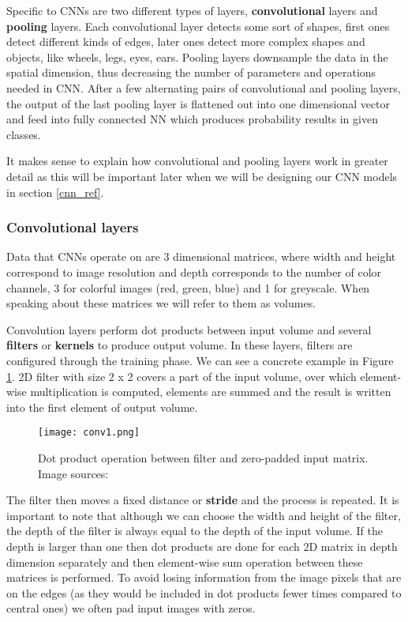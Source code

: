 Specific to CNNs are two different types of layers, \textbf{convolutional} layers and \textbf{pooling} layers.
Each convolutional layer detects some sort of shapes, first ones detect different kinds of edges, later ones detect more complex shapes and objects, like wheels, legs, eyes, ears.
Pooling layers downsample the data in the spatial dimension, thus decreasing the number of parameters and operations needed in CNN.
After a few alternating pairs of convolutional and pooling layers, the output of the last pooling layer is flattened out into one dimensional vector and feed into fully connected NN which produces probability results in given classes.

It makes sense to explain how convolutional and pooling layers work in greater detail as this will be important later when we will be designing our CNN models in section \ref{cnn_ref}.


\subsubsection{ Convolutional layers}

Data that CNNs operate on are 3 dimensional matrices, where width and height correspond to image resolution and depth corresponds to the number of color channels, 3 for colorful images (red, green, blue) and 1 for greyscale.
When speaking about these matrices we will refer to them as volumes.

Convolution layers perform dot products between input volume and several \textbf{filters} or \textbf{kernels} to produce output volume.
In these layers, filters are configured through the training phase.
We can see a concrete example in Figure \ref{conv1}.
2D filter with size 2 x 2 covers a part of the input volume, over which element-wise multiplication is computed, elements are summed and the result is written into the first element of output volume.

\begin{figure}[ht] 
    \centering
    \texttt{[image: conv1.png]} 
    \caption{ Dot product operation between filter and zero-padded input matrix. Image sources: \cite{conv_layer_img}}
    \label{conv1}
\end{figure}

The filter then moves a fixed distance or \textbf{stride} and the process is repeated.
It is important to note that although we can choose the width and height of the filter, the depth of the filter is always equal to the depth of the input volume.
If the depth is larger than one then dot products are done for each 2D matrix in depth dimension separately and then element-wise sum operation between these matrices is performed.
To avoid losing information from the image pixels that are on the edges (as they would be included in dot products fewer times compared to central ones) we often pad input images with zeros.

